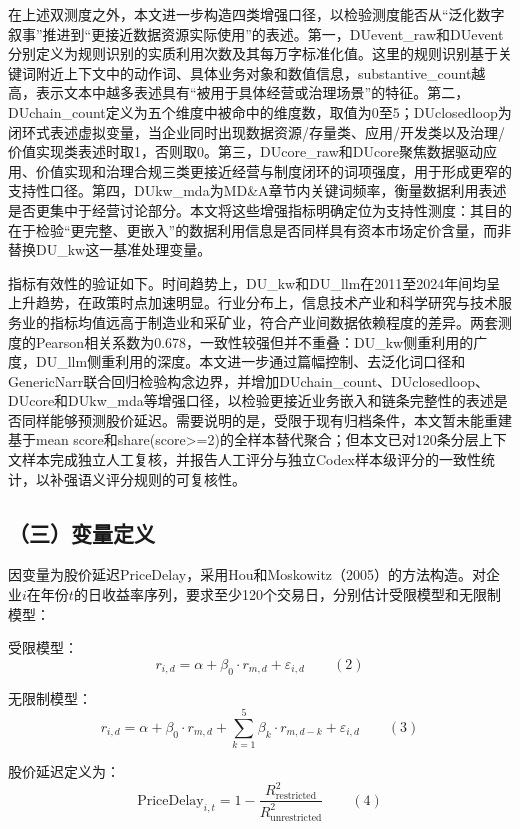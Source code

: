 在上述双测度之外，本文进一步构造四类增强口径，以检验测度能否从``泛化数字叙事''推进到``更接近数据资源实际使用''的表述。第一，DUevent\_raw和DUevent分别定义为规则识别的实质利用次数及其每万字标准化值。这里的规则识别基于关键词附近上下文中的动作词、具体业务对象和数值信息，substantive\_count越高，表示文本中越多表述具有``被用于具体经营或治理场景''的特征。第二，DUchain\_count定义为五个维度中被命中的维度数，取值为0至5；DUclosedloop为闭环式表述虚拟变量，当企业同时出现数据资源/存量类、应用/开发类以及治理/价值实现类表述时取1，否则取0。第三，DUcore\_raw和DUcore聚焦数据驱动应用、价值实现和治理合规三类更接近经营与制度闭环的词项强度，用于形成更窄的支持性口径。第四，DUkw\_mda为MD\&A章节内关键词频率，衡量数据利用表述是否更集中于经营讨论部分。本文将这些增强指标明确定位为支持性测度：其目的在于检验``更完整、更嵌入''的数据利用信息是否同样具有资本市场定价含量，而非替换DU\_kw这一基准处理变量。

指标有效性的验证如下。时间趋势上，DU\_kw和DU\_llm在2011至2024年间均呈上升趋势，在政策时点加速明显。行业分布上，信息技术产业和科学研究与技术服务业的指标均值远高于制造业和采矿业，符合产业间数据依赖程度的差异。两套测度的Pearson相关系数为0.678，一致性较强但并不重叠：DU\_kw侧重利用的广度，DU\_llm侧重利用的深度。本文进一步通过篇幅控制、去泛化词口径和GenericNarr联合回归检验构念边界，并增加DUchain\_count、DUclosedloop、DUcore和DUkw\_mda等增强口径，以检验更接近业务嵌入和链条完整性的表述是否同样能够预测股价延迟。需要说明的是，受限于现有归档条件，本文暂未能重建基于mean score和share(score\textgreater=2)的全样本替代聚合；但本文已对120条分层上下文样本完成独立人工复核，并报告人工评分与独立Codex样本级评分的一致性统计，以补强语义评分规则的可复核性。

\subsection{（三）变量定义}\label{ux4e09ux53d8ux91cfux5b9aux4e49}

因变量为股价延迟PriceDelay，采用Hou和Moskowitz（2005）的方法构造。对企业\(i\)在年份\(t\)的日收益率序列，要求至少120个交易日，分别估计受限模型和无限制模型：

受限模型： \[r_{i,d} = \alpha + \beta_0 \cdot r_{m,d} + \varepsilon_{i,d} \qquad (2)\]

无限制模型： \[r_{i,d} = \alpha + \beta_0 \cdot r_{m,d} + \sum_{k=1}^{5} \beta_k \cdot r_{m,d-k} + \varepsilon_{i,d} \qquad (3)\]

股价延迟定义为： \[\text{PriceDelay}_{i,t} = 1 - \frac{R^2_{\text{restricted}}}{R^2_{\text{unrestricted}}} \qquad (4)\]

